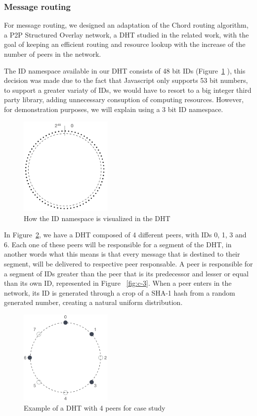 \subsubsection{Message routing}

For message routing, we designed an adaptation of the Chord routing algorithm, a P2P Structured Overlay network, a DHT studied in the related work, with the goal of keeping an efficient routing and resource lookup with the increase of the number of peers in the network.

The ID namespace available in our DHT consists of 48 bit IDs (Figure~\ref{fig:c-1} ), this decision was made due to the fact that Javascript only supports 53 bit numbers, to support a greater variaty of IDs, we would have to resort to a big integer third party library, adding unnecessary consuption of computing resources. However, for demonstration purposes, we will explain using a 3 bit ID namespace.

\begin{figure}[h!]
  \centering
  \includegraphics[width=0.4\textwidth]{figs/chord-1}
  \caption{How the ID namespace is visualized in the DHT}
  \label{fig:c-1}
\end{figure}

In Figure~\ref{fig:c-2}, we have a DHT composed of 4 different peers, with IDs 0, 1, 3 and 6. Each one of these peers will be responsible for a segment of the DHT, in another words what this means is that every message that is destined to their segment, will be delivered to respective peer responsable. A peer is responsible for a segment of IDs greater than the peer that is its predecessor and lesser or equal than its own ID, represented in Figure ~\ref{fig:c-3}. When a peer enters in the network, its ID is generated through a crop of a SHA-1 hash from a random generated number, creating a natural uniform distribution.

\begin{figure}[h!]
  \centering
  \includegraphics[width=0.4\textwidth]{figs/chord-2}
  \caption{Example of a DHT with 4 peers for case study}
  \label{fig:c-2}
\end{figure}

